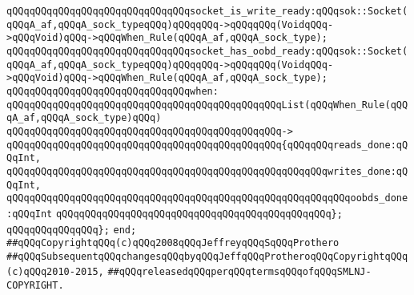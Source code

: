 \verb|qQQqqQQqqQQqqQQqqQQqqQQqqQQqqQQqsocket_is_write_ready:qQQqsok::Socket(qQQqA_af,qQQqA_sock_typeqQQq)qQQqqQQq->qQQqqQQq(VoidqQQq->qQQqVoid)qQQq->qQQqWhen_Rule(qQQqA_af,qQQqA_sock_type);|\newline
\verb|qQQqqQQqqQQqqQQqqQQqqQQqqQQqqQQqsocket_has_oobd_ready:qQQqsok::Socket(qQQqA_af,qQQqA_sock_typeqQQq)qQQqqQQq->qQQqqQQq(VoidqQQq->qQQqVoid)qQQq->qQQqWhen_Rule(qQQqA_af,qQQqA_sock_type);|\newline
\newline
\verb|qQQqqQQqqQQqqQQqqQQqqQQqqQQqqQQqwhen:|\newline
\verb|qQQqqQQqqQQqqQQqqQQqqQQqqQQqqQQqqQQqqQQqqQQqqQQqList(qQQqWhen_Rule(qQQqA_af,qQQqA_sock_type)qQQq)|\newline
\verb|qQQqqQQqqQQqqQQqqQQqqQQqqQQqqQQqqQQqqQQqqQQqqQQq->|\newline
\verb|qQQqqQQqqQQqqQQqqQQqqQQqqQQqqQQqqQQqqQQqqQQqqQQq{qQQqqQQqreads_done:qQQqInt,|\newline
\verb|qQQqqQQqqQQqqQQqqQQqqQQqqQQqqQQqqQQqqQQqqQQqqQQqqQQqqQQqwrites_done:qQQqInt,|\newline
\verb|qQQqqQQqqQQqqQQqqQQqqQQqqQQqqQQqqQQqqQQqqQQqqQQqqQQqqQQqqQQqoobds_done:qQQqInt|\newline
\verb|qQQqqQQqqQQqqQQqqQQqqQQqqQQqqQQqqQQqqQQqqQQqqQQq};|\newline
\verb|qQQqqQQqqQQqqQQq};|\newline
\verb|end;|\newline
\newline
\verb|##qQQqCopyrightqQQq(c)qQQq2008qQQqJeffreyqQQqSqQQqProthero|\newline
\verb|##qQQqSubsequentqQQqchangesqQQqbyqQQqJeffqQQqProtheroqQQqCopyrightqQQq(c)qQQq2010-2015,|\newline
\verb|##qQQqreleasedqQQqperqQQqtermsqQQqofqQQqSMLNJ-COPYRIGHT.|\newline

